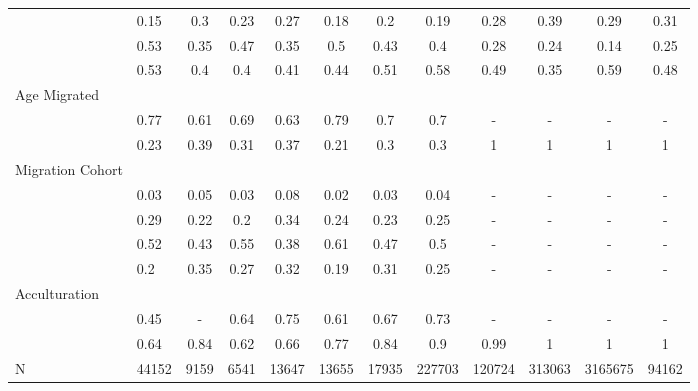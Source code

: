 \documentclass[
]{article}
\begin{document}
\begin{landscape}
\begin{table}[ht]
\begin{tabular}{>{\raggedright\arraybackslash}p{3.2cm}|lcccccc|cccc}
  \multicolumn{1}{>{\raggedleft\arraybackslash}p{2.2cm}|}{\makebox[2.2cm][r]{Lives Alone }}& 0.15 & 0.3 & 0.23 & 0.27 & 0.18 & 0.2 & 0.19 & 0.28 & 0.39 & 0.29 & 0.31 \\ 
  \multicolumn{1}{>{\raggedleft\arraybackslash}p{2.9cm}|}{\makebox[2.9cm][r]{Lives with Child }}& 0.53 & 0.35 & 0.47 & 0.35 & 0.5 & 0.43 & 0.4 & 0.28 & 0.24 & 0.14 & 0.25 \\ 
  \multicolumn{1}{>{\raggedleft\arraybackslash}p{3.4cm}|}{\makebox[3.4cm][r]{Married/Cohabiting }}& 0.53 & 0.4 & 0.4 & 0.41 & 0.44 & 0.51 & 0.58 & 0.49 & 0.35 & 0.59 & 0.48 \\ 
  Age Migrated &  &  &  &  &  &  &  &  &  &  &  \\ 
  \multicolumn{1}{>{\raggedleft\arraybackslash}p{1.6cm}|}{\makebox[1.6cm][r]{24 - 49 }}& 0.77 & 0.61 & 0.69 & 0.63 & 0.79 & 0.7 & 0.7 & - & - & - & - \\ 
  \multicolumn{1}{>{\raggedleft\arraybackslash}p{2.6cm}|}{\makebox[2.6cm][r]{50 and Above }}& 0.23 & 0.39 & 0.31 & 0.37 & 0.21 & 0.3 & 0.3 & 1 & 1 & 1 & 1 \\ 
  Migration Cohort &  &  &  &  &  &  &  &  &  &  &  \\ 
  \multicolumn{1}{>{\raggedleft\arraybackslash}p{2.3cm}|}{\makebox[2.3cm][r]{Before 1965 }}& 0.03 & 0.05 & 0.03 & 0.08 & 0.02 & 0.03 & 0.04 & - & - & - & - \\ 
  \multicolumn{1}{>{\raggedleft\arraybackslash}p{2.2cm}|}{\makebox[2.2cm][r]{1965 - 1979 }}& 0.29 & 0.22 & 0.2 & 0.34 & 0.24 & 0.23 & 0.25 & - & - & - & - \\ 
  \multicolumn{1}{>{\raggedleft\arraybackslash}p{2.2cm}|}{\makebox[2.2cm][r]{1980 - 1999 }}& 0.52 & 0.43 & 0.55 & 0.38 & 0.61 & 0.47 & 0.5 & - & - & - & - \\ 
  \multicolumn{1}{>{\raggedleft\arraybackslash}p{2.1cm}|}{\makebox[2.1cm][r]{After 1999 }}& 0.2 & 0.35 & 0.27 & 0.32 & 0.19 & 0.31 & 0.25 & - & - & - & - \\ 
  Acculturation &  &  &  &  &  &  &  &  &  &  &  \\ 
  \multicolumn{1}{>{\raggedleft\arraybackslash}p{1.6cm}|}{\makebox[1.6cm][r]{Citizen }}& 0.45 & - & 0.64 & 0.75 & 0.61 & 0.67 & 0.73 & - & - & - & - \\ 
  \multicolumn{1}{>{\raggedleft\arraybackslash}p{3cm}|}{\makebox[3cm][r]{English Speakers }}& 0.64 & 0.84 & 0.62 & 0.66 & 0.77 & 0.84 & 0.9 & 0.99 & 1 & 1 & 1 \\ 
  N & 44152 & 9159 & 6541 & 13647 & 13655 & 17935 & 227703 & 120724 & 313063 & 3165675 & 94162 \\ 
   \hline
\end{tabular}
\endgroup
\end{table}



\end{landscape}
\end{document}
